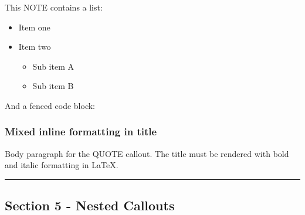 \begin{tcolorbox}[breakable,colback=ocGryBack,colframe=ocGryFrame,coltitle=ocGryTitle,left=3mm,boxed title style={left=1mm},title={\hspace*{-2.5mm}\iconNote\; NOTE with list and code}]

This NOTE contains a list:

\begin{itemize}
\tightlist
\item
  Item one
\item
  Item two

  \begin{itemize}
  \tightlist
  \item
    Sub item A
  \item
    Sub item B
  \end{itemize}
\end{itemize}

And a fenced code block:

\begin{Shaded}
\begin{Highlighting}[]
 
\end{Highlighting}
\end{Shaded}

\end{tcolorbox}

\subsubsection{Mixed inline formatting in
title}\label{inner-1-mixed-inline-formatting-in-title}

\begin{tcolorbox}[breakable,colback=gray!5!white,colframe=gray!60!black,left=3mm,boxed title style={left=1mm},title={\hspace*{-2.5mm}\iconQuote\; A \textbf{Markdown} \emph{formatted} title}]

Body paragraph for the QUOTE callout. The title must be rendered with
bold and italic formatting in LaTeX.

\end{tcolorbox}

\begin{center}\rule{0.5\linewidth}{0.5pt}\end{center}

\subsection{Section 5 - Nested
Callouts}\label{inner-1-section-5---nested-callouts}

